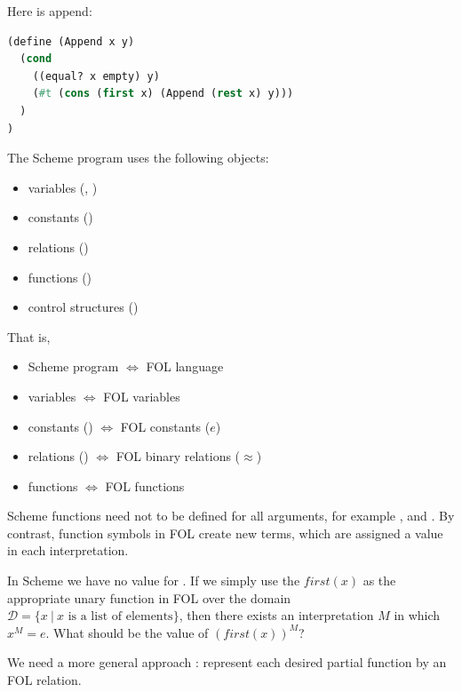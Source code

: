 \documentclass[english, 11pt]{article}
\begin{document}
    \begin{exmp}
      Here is append:
\begin{lstlisting}[language=lisp]
(define (Append x y)
  (cond
    ((equal? x empty) y)
    (#t (cons (first x) (Append (rest x) y)))
  )
)
\end{lstlisting}
    \end{exmp}

    The Scheme program  uses the following objects:
    \begin{itemize}
      \item variables (, )
      \item constants ()
      \item relations ()
      \item functions ()
      \item control structures ()
    \end{itemize}

  That is,

  \begin{itemize}
    \item Scheme program $\iff$ FOL language
    \item variables $\iff$ FOL variables
    \item constants () $\iff$ FOL constants ($e$)
    \item relations () $\iff$ FOL binary relations ($\approx$)
    \item functions $\iff$ FOL functions
  \end{itemize}

  Scheme functions need not to be defined for all arguments, for example , and . By contrast, function symbols in FOL create new terms, which are assigned a value in each interpretation.

  \begin{exmp}
    In Scheme we have no value for . If we simply use the $first(x)$ as the appropriate unary function in FOL over the domain $\mathcal{D} = \{ x \ | \ x \mbox{ \ is a list of elements} \}$, then there exists an interpretation $M$ in which $x^M = e$. What should be the value of $(first(x))^M$?
  \end{exmp}

  We need a more general approach : represent each desired partial function by an FOL relation. \\
\end{document}
